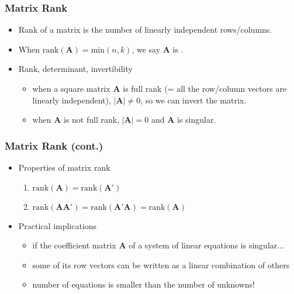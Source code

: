 \documentclass[pdflatex, 12pt]{beamer}
\begin{document}
\begin{frame}
\frametitle{Matrix Rank}
\begin{itemize}
\item Rank of a matrix is the number of linearly independent rows/columns.
\vspace{0.4cm}
\item When $\mathrm{rank}(\bm{A}) = \mathrm{min}(n, k)$, we say $\bm{A}$ is {\color{red}{full rank}}.
\vspace{0.4cm}
\item Rank, determinant, invertibility
 \begin{itemize}
 \item when a square matrix $\bm{A}$ is full rank (= all the row/column vectors are linearly independent), $|\bm{A}| \neq 0$, so we can invert the matrix.
 \item when $\bm{A}$ is not full rank, $|\bm{A}| = 0$ and $\bm{A}$ is singular.
 \end{itemize}
\end{itemize}
\end{frame}

\begin{frame}
\frametitle{Matrix Rank (cont.)}
\begin{itemize}
\item Properties of matrix rank
 \begin{enumerate}
 \item $\mathrm{rank}(\bm{A}) = \mathrm{rank}(\bm{A'})$
 \item $\mathrm{rank}(\bm{AA}') = \mathrm{rank}(\bm{A}'\bm{A}) = \mathrm{rank}(\bm{A})$
 \end{enumerate}
\vspace{0.4cm}
\item Practical implications
 \begin{itemize}
 \item if the coefficient matrix $\bm{A}$ of a system of linear equations is singular...
 \item some of its row vectors can be written as a linear combination of others
 \item number  of equations is smaller than the number of unknowns!
 \end{itemize}
\end{itemize}
\end{frame}
\end{document}
